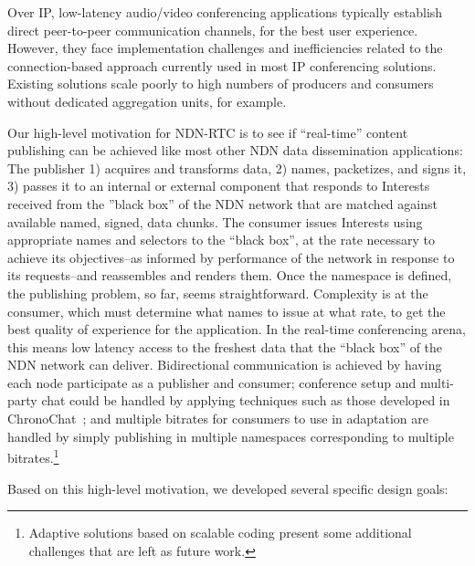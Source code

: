 \documentclass{icn/sig-alternate-2012} %
\newcommand{\ndnrtcName}{NDN-RTC} %
\begin{document}
Over IP, low-latency audio/video conferencing applications typically establish direct peer-to-peer communication channels, for the best user experience. However, they face implementation challenges and inefficiencies related to the connection-based approach currently used in most IP conferencing solutions.  Existing solutions scale poorly to high numbers of producers and consumers without dedicated aggregation units, for example. 

Our high-level motivation for \ndnrtcName{} is to see if ``real-time'' content publishing can be achieved like most other NDN data dissemination applications:  The publisher 1) acquires and transforms data, 2) names, packetizes, and signs it, 3) passes it to an internal or external component that responds to Interests received from the ''black box'' of the NDN network that are matched against available named, signed, data chunks.  The consumer issues Interests using appropriate names and selectors to the ``black box'', at the rate necessary to achieve its objectives--as informed by performance of the network in response to its requests--and reassembles and renders them.  Once the namespace is defined, the publishing problem, so far, seems straightforward.  Complexity is at the consumer, which must determine what names to issue at what rate, to get the best quality of experience for the application.  In the real-time conferencing arena, this means low latency access to the freshest data that the ``black box'' of the NDN network can deliver.  Bidirectional communication is achieved by having each node participate as a publisher and consumer; conference setup and multi-party chat could be handled by applying techniques such as those developed in ChronoChat~\cite{chronochat}; and multiple bitrates for consumers to use in adaptation are handled by simply publishing in multiple namespaces corresponding to multiple bitrates.\footnote{Adaptive solutions based on scalable coding present some additional challenges that are left as future work.} 

Based on this high-level motivation, we developed several specific design goals: 
\end{document}
